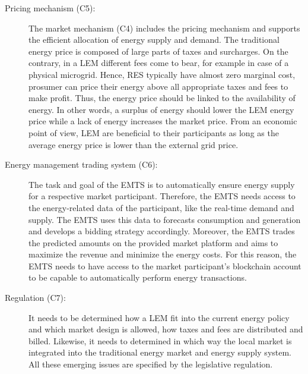 \begin{description}
    \item[Pricing mechanism (C5):] The market mechanism (C4) includes the pricing mechanism 
     and supports the efficient allocation of energy supply and demand. 
     The traditional energy price is composed of large parts of taxes and surcharges.
     On the contrary, in a LEM different fees come to bear, for example in case of a 
     physical microgrid. Hence, RES typically have almost zero marginal cost, prosumer can 
     price their energy above all appropriate taxes and fees to make profit. 
    Thus, the energy price should be linked to the availability of energy. In other words,
    a surplus of energy should lower the LEM energy price while a lack of energy increases the 
    market price. From an economic point of view, LEM are beneficial to their 
    participants as long as the average energy price is lower than the external grid price.
        
    \item[Energy management trading system (C6):] The task and goal of the EMTS
     is to automatically ensure energy supply for a respective market participant.
     Therefore, the EMTS needs access to the energy-related data of the participant, like 
     the real-time demand and supply. The EMTS uses this data to forecasts consumption and
     generation and develops a bidding strategy accordingly. 
     Moreover, the EMTS trades the predicted amounts on the provided market platform 
     and aims to maximize the revenue and minimize the energy costs. 
     For this reason, the EMTS needs to have access to the market participant’s
     blockchain account to be capable to automatically perform energy transactions.

    \item[Regulation (C7):] It needs to be determined how a LEM 
     fit into the current energy policy and which market design is allowed, how 
     taxes and fees are distributed and billed. Likewise, it needs to 
     determined in which way the local market is integrated into the traditional
     energy market and energy supply system.
     All these emerging issues are specified by the legislative regulation.
    
\end{description}

\clearpage